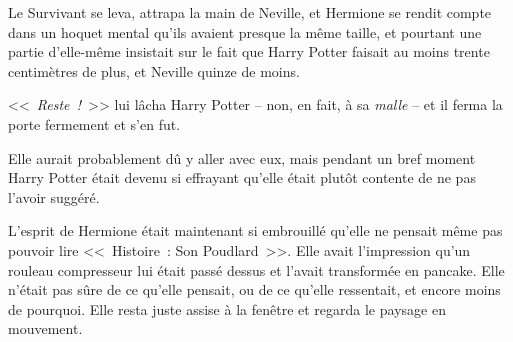 Le Survivant se leva, attrapa la main de Neville, et Hermione se rendit compte dans un hoquet mental qu'ils avaient presque la même taille, et pourtant une partie d'elle-même insistait sur le fait que Harry Potter faisait au moins trente centimètres de plus, et Neville quinze de moins.

<<~\emph{Reste~!}~>> lui lâcha Harry Potter -- non, en fait, à sa \emph{malle} -- et il ferma la porte fermement et s'en fut.

Elle aurait probablement dû y aller avec eux, mais pendant un bref moment Harry Potter était devenu si effrayant qu'elle était plutôt contente de ne pas l'avoir suggéré.

L'esprit de Hermione était maintenant si embrouillé qu'elle ne pensait même pas pouvoir lire <<~Histoire~: Son Poudlard~>>. Elle avait l'impression qu'un rouleau compresseur lui était passé dessus et l'avait transformée en pancake. Elle n'était pas sûre de ce qu'elle pensait, ou de ce qu'elle ressentait, et encore moins de pourquoi. Elle resta juste assise à la fenêtre et regarda le paysage en mouvement.

